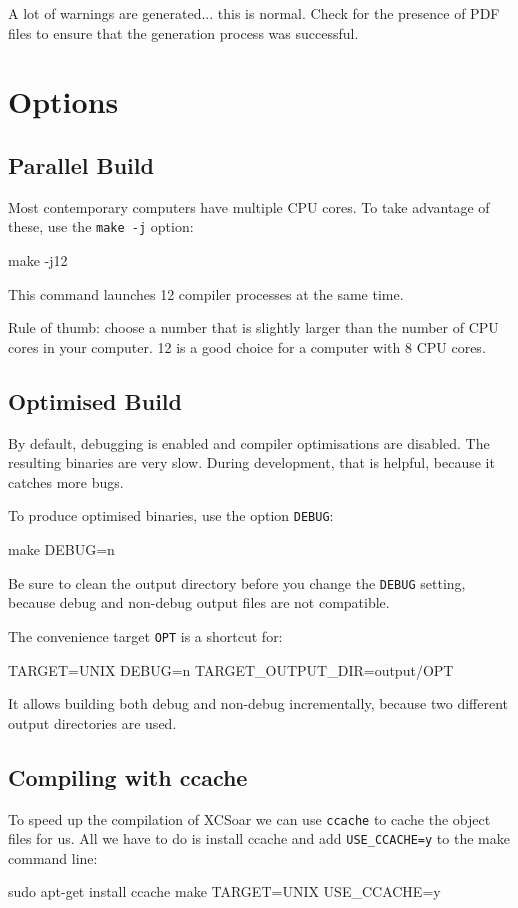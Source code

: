 A lot of warnings are generated... this is normal. Check for the presence of PDF files 
to ensure that the generation process was successful.
\section{Options}

\subsection{Parallel Build}

Most contemporary computers have multiple CPU cores.  To take
advantage of these, use the \texttt{make -j} option:

\begin{verbatim*}
make -j12
\end{verbatim*}

This command launches 12 compiler processes at the same time.

Rule of thumb: choose a number that is slightly larger than the number
of CPU cores in your computer.  12 is a good choice for a computer
with 8 CPU cores.

\subsection{Optimised Build}

By default, debugging is enabled and compiler optimisations are
disabled.  The resulting binaries are very slow.  During development,
that is helpful, because it catches more bugs.

To produce optimised binaries, use the option \texttt{DEBUG}:

\begin{verbatim*}
make DEBUG=n
\end{verbatim*}

Be sure to clean the output directory before you change the
\texttt{DEBUG} setting, because debug and non-debug output files are
not compatible.

The convenience target \texttt{OPT} is a shortcut for:

\begin{verbatim*}
TARGET=UNIX DEBUG=n TARGET_OUTPUT_DIR=output/OPT
\end{verbatim*}

It allows building both debug and non-debug incrementally, because two
different output directories are used.

\subsection{Compiling with ccache}

To speed up the compilation of XCSoar we can use \texttt{ccache} to cache the 
object files for us. All we have to do is install ccache and 
add 
\texttt{USE\_CCACHE=y} 
to the make command line:

\begin{verbatim*}
sudo apt-get install ccache
make TARGET=UNIX USE_CCACHE=y
\end{verbatim*}
